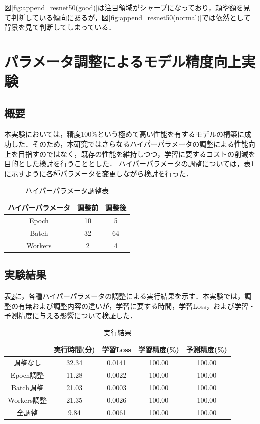 \documentclass[a4paper,11pt,titlepage]{jsarticle}
\begin{document}
図\ref{fig:append_resnet50(good)}は注目領域がシャープになっており，頬や額を見て判断している傾向にあるが，図\ref{fig:append_resnet50(normal)}では依然として背景を見て判断してしまっている．


\section{パラメータ調整によるモデル精度向上実験}
\subsection{概要}
本実験においては，精度100\%という極めて高い性能を有するモデルの構築に成功した．そのため，本研究ではさらなるハイパーパラメータの調整による性能向上を目指すのではなく，既存の性能を維持しつつ，学習に要するコストの削減を目的とした検討を行うこととした．
ハイパーパラメータの調整については，表\ref{hyper table}に示すように各種パラメータを変更しながら検討を行った．
\begin{table}[httb]
\centering
\caption{ハイパーパラメータ調整表}
\label{hyper table}
\begin{tabular}{|c|c|c|}
\hline
ハイパーパラメータ& 調整前& 調整後 \\
\hline
Epoch&10&5 \\
\hline
Batch&32&64 \\
\hline
Workers&2&4 \\
\hline
\end{tabular}
\end{table}

\subsection{実験結果}

表\ref{hyper result}に，各種ハイパーパラメータの調整による実行結果を示す．本実験では，調整の有無および調整内容の違いが，学習に要する時間，学習Loss，および学習・予測精度に与える影響について検証した．

\begin{table}[httb]
\centering
\caption{実行結果}
\label{hyper result}
\begin{tabular}{|c|c|c|c|c|}
\hline
&実行時間(分)&学習Loss&学習精度(\%)&予測精度(\%)\\
\hline
調整なし&32.34&0.0141&100.00&100.00\\
\hline
Epoch調整&11.28&0.0022&100.00&100.00\\
\hline
Batch調整&21.03&0.0003&100.00&100.00\\
\hline
Workers調整&21.35&0.0026&100.00&100.00\\
\hline
全調整&9.84&0.0061&100.00&100.00\\
\hline
\end{tabular}
\end{table}
\end{document}
